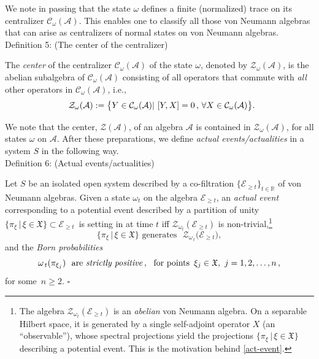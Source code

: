 \documentclass[12pt]{article}
\begin{document}
We note in passing that the state $\omega$ defines a finite (normalized) trace on its centralizer 
$\mathcal{C}_{\omega}(\mathcal{A})$. This enables one to classify all those von Neumann algebras that can arise as 
centralizers of normal states on von Neumann algebras.\\

{Definition 5}: (The center of the centralizer)

The \textit{center} of the centralizer $\mathcal{C}_{\omega}(\mathcal{A})$ of the state $\omega$, denoted by 
$\mathcal{Z}_{\omega}(\mathcal{A})$, is the abelian subalgebra of $\mathcal{C}_{\omega}(\mathcal{A})$ consisting
of all operators that commute with \textit{all} other operators in 
$\mathcal{C}_{\omega}(\mathcal{A})$, i.e.,
$$
\hspace{2.5cm}\mathcal{Z}_{\omega}(\mathcal{A}):= \big\{ Y \in \mathcal{C}_{\omega}(\mathcal{A})| \,\,[Y,X]=0\,,\, \forall X \in 
\mathcal{C}_{\omega}(\mathcal{A}) \big\}. \hspace{2.3cm} \square
$$

 We note that the center, $\mathcal{Z}(\mathcal{A})$, of an algebra $\mathcal{A}$ is contained in 
 $\mathcal{Z}_{\omega}(\mathcal{A})$, for all states $\omega$ on $\mathcal{A}$. After these preparations, 
 we define \textit{actual events/actualities} in a system $S$ in the following way.\\
 
 {Definition 6}: (Actual events/actualities) \label{ETHevent}
 
Let $S$ be an isolated open system described by a co-filtration $\big\{ \mathcal{E}_{\geq t} \big\}_{t \in \mathbb{R}}$ of von 
Neumann algebras. Given a state $\omega_t$ on the algebra $\mathcal{E}_{\geq t}$, an \textit{actual event} corresponding 
to a potential event described  by a partition of unity 
$\big\{ \pi_{\xi}\,\vert\, \xi \in \mathfrak{X} \big\} \subset \mathcal{E}_{\geq t}$\, is setting in
 at time $t$ iff $\mathcal{Z}_{\omega_t}(\mathcal{E}_{\geq t})$ is non-trivial,\footnote{The 
 algebra $\mathcal{Z}_{\omega_{t}}(\mathcal{E}_{\geq t})$ is an \textit{abelian} von Neumann algebra.
On a separable Hilbert space, it is generated by a single self-adjoint operator $X$ (an ``observable''), 
whose spectral projections yield the projections $\lbrace \pi_{\xi}\,\vert \, \xi \in \mathfrak{X} \rbrace$
describing a potential event. This is the motivation behind \eqref{act-event}.}
\begin{equation}\label{act-event}
\big\{ \pi_{\xi}\,\vert \,\xi \in \mathfrak{X} \big\} \,\,\text{generates   }\,\, \mathcal{Z}_{\omega_{\,t}}\big(\mathcal{E}_{\geq t}\big),
\end{equation}
and the \textit{Born probabilities}
\begin{equation}\label{Born}
\omega_{\,t}(\pi_{\xi_{j}}) \,\,\text{ are \textit{strictly positive}}\,, \,\, \text{ for points }\,\xi_j \in \mathfrak{X}, \,\, j=1,2, \dots, n\,, 
\end{equation}
for some~$n\geq 2$. \hspace{12cm}$\square$
\end{document}
